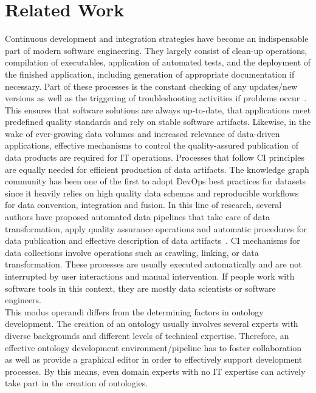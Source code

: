 \documentclass[runningheads]{llncs}
\begin{document}
\section{Related Work}\label{sec:related}
Continuous development and integration strategies have become an indispensable part of modern software engineering.
They largely consist of clean-up operations, compilation of executables, application of automated tests, and the deployment of the finished application, including generation of appropriate documentation if necessary. Part of these processes is the constant checking of any updates/new versions as well as the triggering of troubleshooting activities if problems occur~\cite{fowler}.
This ensures that software solutions are always up-to-date, that applications meet predefined quality standards and rely on stable software artifacts. Likewise, in the wake of ever-growing data volumes and increased relevance of data-driven applications, effective mechanisms to control the quality-assured publication of data products are required for IT operations. Processes that follow CI principles are equally needed for efficient production of data artifacts. The knowledge graph community has been one of the first to adopt DevOps best practices for datasets since it heavily relies on high quality data schemas and reproducible workflows for data conversion, integration and fusion. In this line of research, several authors have proposed automated data pipelines that take care of data transformation, apply quality assurance operations and automatic procedures for data publication and effective description of data artifacts~\cite{cirulli,klimek,kucera,meissner,rojas,roman,stadler,dataid}. CI mechanisms for data collections involve operations such as crawling, linking, or data transformation. These processes are usually executed automatically and are not interrupted by user interactions and manual intervention. If people work with software tools in this context, they are mostly data scientists or software engineers.\\
This modus operandi differs from the determining factors in ontology development. The creation of an ontology usually involves several experts with diverse backgrounds and different levels of technical expertise. Therefore, an effective ontology development environment/pipeline has to foster collaboration as well as provide a graphical editor in order to effectively support development processes. By this means, even domain experts with no IT expertise can actively take part in the creation of ontologies.\\
\end{document}
